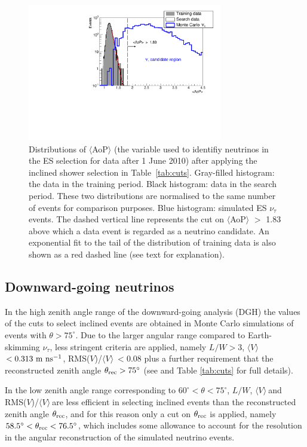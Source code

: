 \documentclass[reprint,showpacs,showkeys,amsmath,amssymb,aps,nofootinbib]{revtex4-1}
\def \vavrg {$\langle V \rangle ~$}
\begin{document}
\begin{figure}[!t]
\centering
\includegraphics[width=8.5cm]{./Unblinding_ES_200613.pdf}
\vskip -3mm
\caption{
Distributions of $\langle$AoP$\rangle$ (the variable used to identifiy neutrinos
in the ES selection for data after 1 June 2010)
after applying the inclined shower selection in Table~\ref{tab:cuts}.
Gray-filled histogram: the data in the training period. 
Black histogram: data 
in the search period. These two distributions are normalised to the same number 
of events for comparison purposes. Blue histogram: 
simulated ES $\nu_\tau$ events. The dashed vertical line represents 
the cut on $\langle$AoP$\rangle$ $>$ 1.83 above which a data event is regarded as a neutrino candidate.
An exponential fit to the tail of the distribution of training data is also shown 
as a red dashed line (see text for explanation).
}
\label{fig:AoP}
\end{figure}


\subsection{Downward-going neutrinos} 

In the high zenith angle range of the downward-going analysis (DGH)
the values of the cuts to select inclined events are obtained in 
Monte Carlo simulations of events with $\theta>75^\circ$. Due 
to the larger angular range compared to Earth-skimming $\nu_\tau$,
less stringent criteria are applied, namely $L/W>3$,
\vavrg$<0.313~{\rm m~ns^{-1}}$, RMS($V$)/\vavrg$<0.08$
plus a further requirement that the reconstructed zenith 
angle $\theta_{\rm rec}>75^\circ$ (see \cite{DGH} and Table \ref{tab:cuts}
for full details).

In the low zenith angle range corresponding to $60^\circ < \theta < 75^\circ$,
$L/W$, \vavrg and RMS($V$)/\vavrg are less efficient in selecting 
inclined events than the reconstructed zenith angle $\theta_{\rm rec}$,
and for this reason only a cut on $\theta_{\rm rec}$ is applied, namely
$58.5^\circ < \theta_{\rm rec} < 76.5^\circ$,
which includes some allowance to account for the resolution in the angular reconstruction 
of the simulated neutrino events. 
\end{document}
